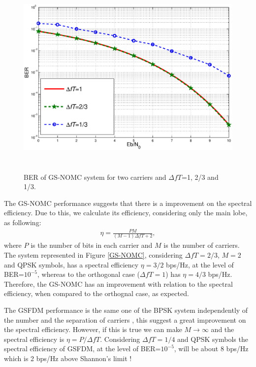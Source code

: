 \documentclass[draftcls,12pt, onecolumn, twoside]{IEEEtran}
\begin{document}
\begin{figure}[!htb]
\begin{center}
\includegraphics[height=10cm]{fig1_IET2.eps}
\caption{BER of GS-NOMC system for two carriers and $\Delta fT$=1, 2/3 and 1/3.}
\label{BER}
\end{center}
\end{figure}

The GS-NOMC performance suggests that there is a improvement on the spectral efficiency. Due to this, we calculate its efficiency, considering only the main lobe, as following:
\begin{eqnarray}
\eta=\frac{PM}{(M-1)\Delta fT + 2}, \nonumber
\end{eqnarray}
where $P$ is the number of bits in each carrier and $M$ is the number of carriers. The system represented in Figure \ref{GS-NOMC}, considering $\Delta fT=2/3$, $M=2$ and QPSK symbols, has a spectral efficiency $\eta=3/2$ bps/Hz, at the level of BER=$10^{-5}$, whereas to the orthogonal case ($\Delta fT=1$) has $\eta=4/3$ bps/Hz. Therefore, the GS-NOMC has an improvement with relation to the spectral efficiency, when compared to the orthognal case, as expected.

The GSFDM performance is the same one of the BPSK system independently of the number and the separation of carriers \cite{Zhang}, this suggest a great improvement on the spectral efficiency. However, if this is true we can make $M \to \infty$ and the spectral efficiency is $\eta=P/\Delta fT$. Considering $\Delta fT=1/4$ and QPSK symbols the spectral efficiency of GSFDM, at the level of BER=$10^{-5}$,  will be about 8 bps/Hz which is 2 bps/Hz above Shannon's limit \cite{Proakis}!
\vspace{-5pt}
\end{document}
